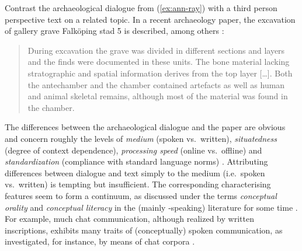 \documentclass[output=paper
 	        ,biblatex
                ,babelshorthands
                ,newtxmath
                ,draftmode
                ,colorlinks, citecolor=brown
]{langscibook}
\begin{document}
\noindent
Contrast the archaeological dialogue from (\ref{ex:ann-ray}) with a third person perspective text on a related topic.
%
In a recent archaeology paper, the excavation of gallery grave Falköping stad 5 is described, among others \citep[]{Blank:Tornberg:Knipper:2018}:
%
\begin{quote}
During excavation the grave was divided in different sections and layers and the finds were documented in these units. The bone material lacking stratographic and spatial information derives from the top layer [\ldots]. Both the antechamber and the chamber contained artefacts as well as human and animal skeletal remains, although most of the material was found in the chamber.
\end{quote}

\noindent
The differences between the archaeological dialogue and the paper are obvious and concern roughly the levels of \emph{medium} (spoken vs.\ written), \emph{situatedness} (degree of context dependence), \emph{processing speed} (online vs.\ offline) and \emph{standardization} (compliance with standard language norms) \citep{Klein:1985}.
%
Attributing differences between dialogue and text simply to the medium (i.e.\ spoken vs.\ written) is tempting but insufficient. 
%
The corresponding characterising features seem to form a continuum, as discussed under the terms \emph{conceptual orality} and \emph{conceptual literacy} in the (mainly -speaking) literature for some time \citep{Koch:Oesterreicher:1985}.
%
For example, much chat communication, although realized by written inscriptions, exhibits many traits of (conceptually) spoken communication, as investigated, for instance, by means of chat corpora \citep{Beisswenger:et:al:2012:a}. 
%
\end{document}
